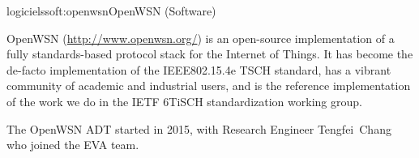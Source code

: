 \documentclass{ra2016}
\begin{document}
\begin{module}{logiciels}{soft:openwsn}{OpenWSN (Software)}

\begin{participants}
\end{participants}

OpenWSN (\url{http://www.openwsn.org/}) is an open-source implementation of a fully standards-based protocol stack for the Internet of Things.
It has become the de-facto implementation of the IEEE802.15.4e TSCH standard, has a vibrant community of academic and industrial users, and is the reference implementation of the work we do in  the IETF 6TiSCH standardization working group.

The OpenWSN ADT started in 2015, with Research Engineer Tengfei~Chang who joined the EVA team.


\end{module}
\end{document}
